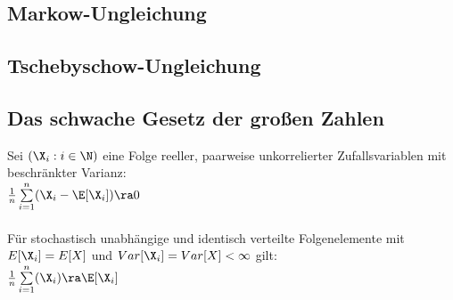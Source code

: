 \documentclass[german,color,6pt]{latex4ei/latex4ei_sheet}
\begin{document}
\begin{sectionbox}
	\subsection{Markow-Ungleichung}
\end{sectionbox}

\begin{sectionbox}
	\subsection{Tschebyschow-Ungleichung}
	
	
\end{sectionbox}
\begin{sectionbox}
	\subsection{Das schwache Gesetz der großen Zahlen}
	Sei $(\X_i : i \in \N)$ eine Folge reeller, paarweise unkorrelierter Zufallsvariablen mit beschränkter Varianz:\\
	$\frac{1}{n} \sum\limits_{i = 1}^n (\X_i - \E[\X_i]) \ra 0$\\ \\
	Für stochastisch unabhängige und identisch verteilte Folgenelemente mit $E[\X_i] = E[X]$ und $Var[\X_i] = Var[X] < \infty$ gilt: \\
	$\frac{1}{n} \sum\limits_{i = 1}^n (\X_i) \ra \E[\X_i] $
\end{sectionbox}

\end{document}
